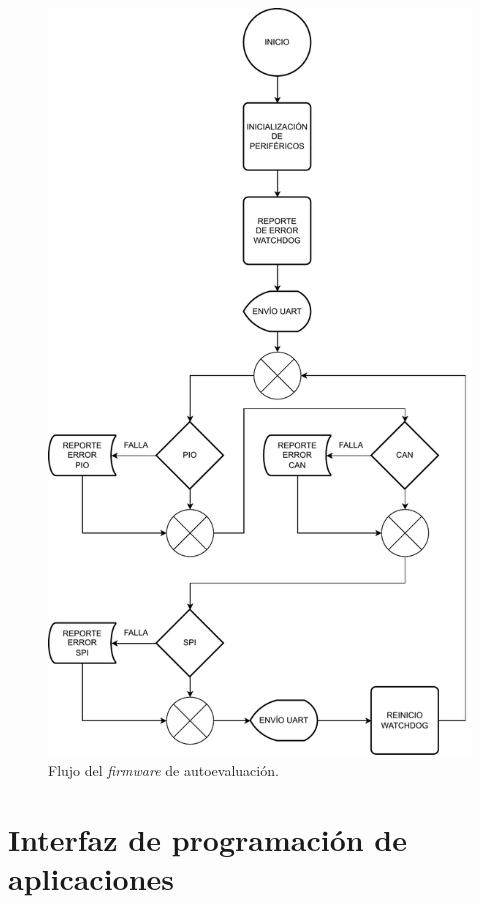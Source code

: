 \begin{figure}[htbp]
	\centering
	\includegraphics[width=\textwidth]{./Figures/firmwareflow.pdf}
    \caption{Flujo del \emph{firmware} de autoevaluación.}
	\label{fig:firmwareflow}
\end{figure}

\newpage

\section{Interfaz de programación de aplicaciones}
\label{sec:api}

